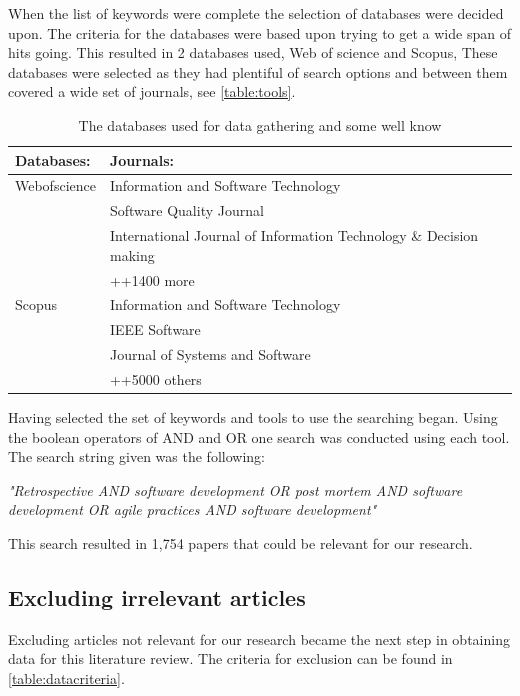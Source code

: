 \documentclass[12pt]{article}
\begin{document}
When the list of keywords were complete the selection of databases were decided upon. The criteria for the databases were based upon trying to get a wide span of hits going. This resulted in 2 databases used, Web of science and Scopus, These databases were selected as they had plentiful of search options and between them covered a wide set of journals, see \autoref{table:tools}. 

\begin{table}[!h]
	\begin{center}
		\caption{The databases used for data gathering and some well know}
		\label{table:tools}
		\begin{tabular}{ l | p{}}
			Databases: & Journals: \\ \hline
			Webofscience & Information and Software Technology \\ 
			& Software Quality Journal \\
			& International Journal of Information Technology \& Decision making \\
			& ++1400 more \\
			\hline
			Scopus & Information and Software Technology \\ 
			& IEEE Software\\
			& Journal of Systems and Software \\
			& ++5000 others \\
		\end{tabular}
	\end{center}
\end{table}

Having selected the set of keywords and tools to use the searching began. Using the boolean operators of AND and OR one search was conducted using each tool. The search string given was the following: 
\begin{center}
	\emph{"Retrospective AND software development OR post mortem AND software development OR agile practices AND software development"}
\end{center}
This search resulted in 1,754 papers that could be relevant for our research.

\subsection{Excluding irrelevant articles}
Excluding articles not relevant for our research became the next step in obtaining data for this literature review. The criteria for exclusion can be found in \autoref{table:datacriteria}. \\
\end{document}

